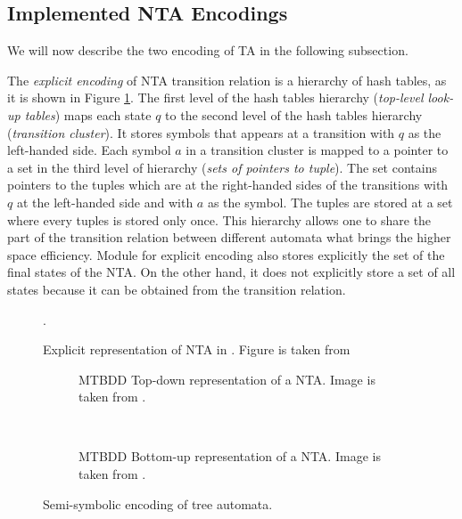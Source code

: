 \subsection{Implemented NTA Encodings}

We will now describe the two encoding of TA in the following subsection.

The \emph{explicit encoding} of NTA transition relation is a hierarchy
of hash tables, as it is shown in Figure \ref{fig:explnta}.
The first level of the hash tables hierarchy (\emph{top-level look-up tables}) maps each state $q$ to 
the second level of the hash tables hierarchy (\emph{transition cluster}).
It stores symbols that appears at a transition with $q$ as the left-handed side.
Each symbol $a$ in a transition cluster is mapped to a pointer to a set in the third level of hierarchy (\emph{sets of pointers to tuple}).
The set contains pointers to the tuples which are at the right-handed sides of
the transitions with $q$ at the left-handed side and with $a$ as the symbol.
The tuples are stored at a set where every tuples is stored only once.
This hierarchy allows one to share the part of the transition
relation between different automata
what brings the higher space efficiency.
Module for explicit encoding also stores explicitly the set of the final states of the NTA.
On the other hand, it does not explicitly store a set of all states because it can be obtained from the transition relation.

\begin{figure}[bt]
\begin{center}

	\caption{Explicit representation of NTA in \vata. Figure is taken from \cite{libvata}}.
	\label{fig:explnta}
\end{center}
\end{figure}

\begingroup
{}%
\begin{figure}[bt]
	\centering
	\begin{subfigure}{.5\textwidth}
		\centering
		
		\caption{MTBDD Top-down representation of a NTA. Image is taken from \cite{libvata}.}
		\label{fig:mtbdd_td}
	\end{subfigure}%
	~
	\begin{subfigure}{.5\textwidth}
	\centering
	
	\caption{MTBDD Bottom-up representation of a NTA. Image is taken from \cite{libvata}.}
	\label{fig:mtbdd_bu}
	\end{subfigure}%
\caption{Semi-symbolic encoding of tree automata.}
\label{fig:symnta}
\end{figure}
\endgroup

